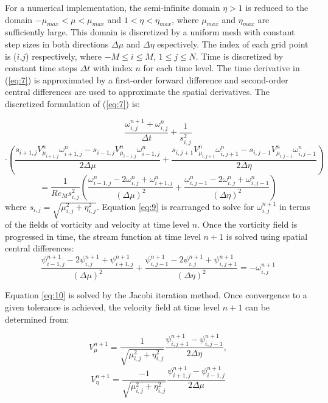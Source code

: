 For a numerical implementation, the semi-infinite domain $\eta > 1$ is reduced to the domain $-\mu_{max} < \mu < \mu_{max}$ and $1 < \eta < \eta_{max}$, where $\mu_{max}$ and $\eta_{max}$ are sufficiently large. This domain is discretized by a uniform mesh with constant step sizes in both directions $\Delta \mu$ and $\Delta \eta$ espectively. The index of each grid point is ($i$,$j$) respectively, where $-M \le i \le M$, $1 \le j \le N$. Time is discretized by constant time steps $\Delta t$ with index $n$ for each time level. The time
derivative in (\ref{eq:7}) is approximated by a first-order forward difference and second-order central
differences are used to approximate the spatial derivatives. The discretized formulation of (\ref{eq:7}) is:

\[
\frac{\omega^{n+1}_{i,j}+\omega^n_{i,j}}{\Delta t} + \frac{1}{s^2_{i,j}}
\]
\[
\cdot \left(
\frac{s_{i+1,j}V^n_{\mu_{i+1,j}}\omega^n_{i+1,j}-s_{i-1,j}V^n_{\mu_{i-1,j}}\omega^n_{i-1,j}}
     {2\Delta\mu}
+
\frac{s_{i,j+1}V^n_{\mu_{i,j+1}}\omega^n_{i,j+1}-s_{i,j-1}V^n_{\mu_{i,j-1}}\omega^n_{i,j-1}}
     {2\Delta\eta}
\right)
\]
\begin{equation}
\label{eq:9}
=\frac{1}{Re_M s^2_{i,j}}
\left(
\frac{\omega^n_{i-1,j}-2\omega^n_{i,j}+\omega^n_{i+1,j}}{(\Delta\mu)^2}
+
\frac{\omega^n_{i,j-1}-2\omega^n_{i,j}+\omega^n_{i,j-1}}{(\Delta\eta)^2}
\right)
\end{equation}
where $s_{i,j}=\sqrt{\mu^2_{i,j}+\eta^2_{i,j}}$.
Equation \ref{eq:9} is rearranged to solve for $\omega^{n+1}_{i,j}$ in terms of the fields of
vorticity and velocity at time level $n$.
Once the vorticity field is progressed in time, the stream
function at time level $n+1$ is solved using spatial central differences:
\begin{equation}
\label{eq:10}
\frac{\psi^{n+1}_{i-1,j}-2\psi^{n+1}_{i,j}+\psi^{n+1}_{i+1,j}}{(\Delta\mu)^2}+
\frac{\psi^{n+1}_{i,j-1}-2\psi^{n+1}_{i,j}+\psi^{n+1}_{i,j+1}}{(\Delta\eta)^2}
=-\omega^{n+1}_{i,j}
\end{equation}

Equation \ref{eq:10} is solved by the Jacobi iteration method. Once convergence to a given tolerance is achieved, the velocity field at time level $n+1$ can be determined from:

\[
V_\mu^{n+1}=\frac{1}{\sqrt{\mu_{i,j}^2+\eta_{i,j}^2}} \frac{\psi_{i,j+1}^{n+1} - \psi_{i,j-1}^{n+1}}{2\Delta \eta},
\]
\begin{equation}
\label{eq:11}
V_\eta^{n+1}=\frac{-1}{\sqrt{\mu_{i,j}^2+\eta_{i,j}^2}} \frac{\psi_{i+1,j}^{n+1} - \psi_{i-1,j}^{n+1}}{2\Delta \mu}
\end{equation}

